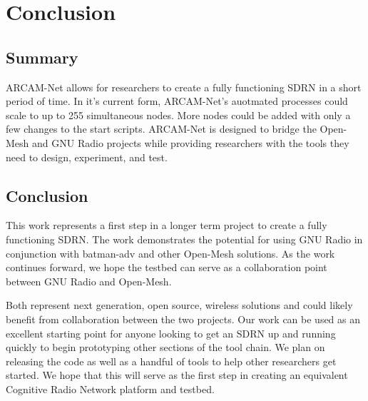 
\chapter{Conclusion} %

\label{Chapter6} %




\section{Summary}

ARCAM-Net allows for researchers to create a fully functioning SDRN in a short period of time. In it's current form, ARCAM-Net's auotmated processes could scale to up to 255 simultaneous nodes. More nodes could be added with only a few changes to the start scripts. ARCAM-Net is designed to bridge the Open-Mesh and GNU Radio projects while providing researchers with the tools they need to design, experiment, and test. 


\section{Conclusion}

This work represents a first step in a longer term project to create a fully functioning SDRN. The work demonstrates the potential for using GNU Radio in conjunction with batman-adv and other Open-Mesh solutions. As the work continues forward, we hope the testbed can serve as a collaboration point between GNU Radio and Open-Mesh.

Both represent next generation, open source, wireless solutions and could likely benefit from collaboration between the two projects. Our work can be used as an excellent starting point for anyone looking to get an SDRN up and running quickly to begin prototyping other sections of the tool chain. We plan on releasing the code as well as a handful of tools to help other researchers get started. We hope that this will serve as the first step in creating an equivalent Cognitive Radio Network platform and testbed. 

